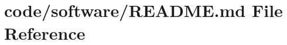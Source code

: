 \hypertarget{code_2software_2README_8md}{}\section{code/software/\+R\+E\+A\+D\+ME.md File Reference}
\label{code_2software_2README_8md}
